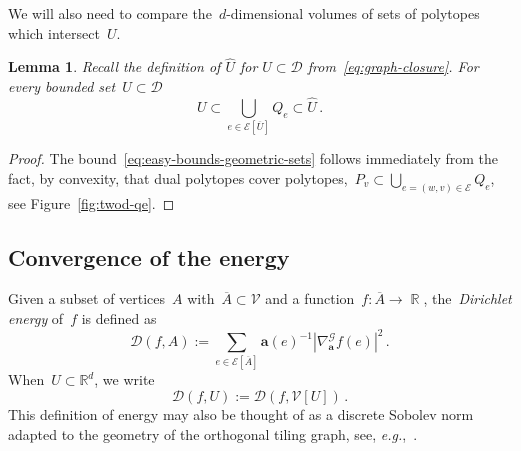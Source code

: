 \documentclass[12pt]{amsart}
\numberwithin{equation}{section}
\DeclareMathOperator{\R}{\mathbb{R}}
\DeclareMathOperator{\diam}{{\mathop{diam}}}
\newcommand{\eg}{{\it e.g.}}
\newtheorem{lemma}[theorem]{Lemma}
\newcommand*{\Rd}{\ensuremath{\mathbb{R}^d}}
\newcommand{\V}{\mathcal{V}}
\newcommand{\E}{\mathcal{E}}
\newcommand{\cond}{\hyperref[eq:geometric-laplacian]{\mathbf{a}}}
\newcommand{\anabla}{\hyperref[eq:anabla]{{\nabla^{\mathcal{G}}_{\cond}}}}
\newcommand{\D}{\hyperref[eq:dir.energy]{\mathcal{D}}}
\newcommand{\GCU}{\hyperref[eq:graph-closure]{\widehat{U}}}
\newcommand{\Qe}{\hyperref[eq:qeset]{Q_e}}
\DeclareMathOperator{\vol}{\mathbf{vol}}
\begin{document}
We will also need to compare the~$d$-dimensional volumes of sets of polytopes which intersect~$U$.
\begin{lemma} \label{lemma:easy-global-qe-bounds}
	 Recall the definition of $\GCU$ for $U\subset \mathcal{D}$ from~\eqref{eq:graph-closure}. For every bounded set~$U \subset \mathcal{D}$
	\begin{equation}
		\label{eq:easy-bounds-geometric-sets}
	   U \subset \bigcup_{e \in \E[\overline{U}]} \Qe \subset \GCU \, . 
\end{equation}
\end{lemma}

\begin{proof}
	
	
The bound~\eqref{eq:easy-bounds-geometric-sets} follows immediately from the fact, by convexity, that dual polytopes cover polytopes,~$P_v \subset \bigcup_{e=(w,v) \in \E} \Qe$, see Figure~\ref{fig:twod-qe}. 
\end{proof}




\subsection{Convergence of the energy} 
Given a subset of vertices~$A$ with~$\overline{A} \subset \V$ and a function~$f: \overline{A} \to \R$, the~\emph{Dirichlet energy}
of~$f$ is defined as 
 \begin{equation} \label{eq:dir.energy}
	\D(f, A) :=  \sum_{e \in \E[\overline{A}]} \cond(e)^{-1} |\anabla f(e)|^2  \, . 
\end{equation} 
When~$U \subset \Rd$, we write
\[
\D(f, U) := \D(f, \V[U]) \,. 
\]
This definition of energy may also be thought of as a discrete Sobolev norm adapted to the geometry of the orthogonal tiling graph, see, \eg,~\cite[Definition 9.3]{eymard2000finite}.
\end{document}
